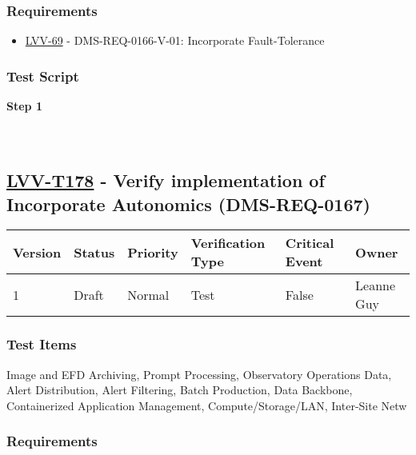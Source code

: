 \hypertarget{requirements-154}{%
\subsubsection{Requirements}\label{requirements-154}}

\begin{itemize}
\tightlist
\item
  \href{https://jira.lsstcorp.org/browse/LVV-69}{LVV-69} -
  DMS-REQ-0166-V-01: Incorporate Fault-Tolerance
\end{itemize}

\hypertarget{test-script-154}{%
\subsubsection{Test Script}\label{test-script-154}}

\textbf{Step 1}\\
~\\
~\\

\hypertarget{lvv-t178---verify-implementation-of-incorporate-autonomics-dms-req-0167}{%
\subsection{\texorpdfstring{\href{https://jira.lsstcorp.org/secure/Tests.jspa\#/testCase/LVV-T178}{LVV-T178}
- Verify implementation of Incorporate Autonomics
(DMS-REQ-0167)}{LVV-T178 - Verify implementation of Incorporate Autonomics (DMS-REQ-0167)}}\label{lvv-t178---verify-implementation-of-incorporate-autonomics-dms-req-0167}}

\begin{longtable}[]{@{}llllll@{}}
\toprule
Version & Status & Priority & Verification Type & Critical Event &
Owner\tabularnewline
\midrule
\endhead
1 & Draft & Normal & Test & False & Leanne Guy\tabularnewline
\bottomrule
\end{longtable}

\hypertarget{test-items-154}{%
\subsubsection{Test Items}\label{test-items-154}}

Image and EFD Archiving, Prompt Processing, Observatory Operations Data,
Alert Distribution, Alert Filtering, Batch Production, Data Backbone,
Containerized Application Management, Compute/Storage/LAN, Inter-Site
Netw

\hypertarget{requirements-155}{%
\subsubsection{Requirements}\label{requirements-155}}

